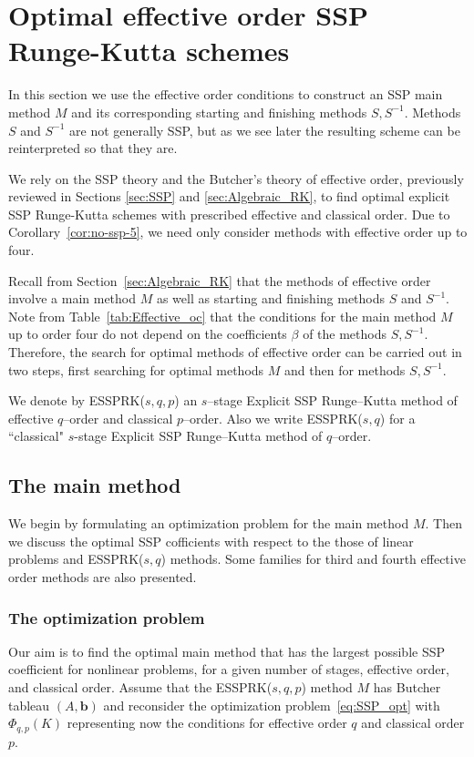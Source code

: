 \section{Optimal effective order SSP Runge-Kutta schemes}\label{sec:optimal_ESSPRK}
In this section we use the effective order conditions to construct an SSP main method $M$ and 
its corresponding starting and finishing methods $S, S^{-1}$. 
Methods $S$ and $S^{-1}$ are not generally SSP, but as we see later the resulting scheme can 
be reinterpreted so that they are.

We rely on the SSP theory and the Butcher's theory of effective order, previously reviewed in 
Sections \ref{sec:SSP} and \ref{sec:Algebraic_RK}, to find optimal explicit SSP Runge-Kutta 
schemes with prescribed effective and classical order. 
Due to Corollary~\ref{cor:no-ssp-5}, we need only consider methods with effective order up 
to four.

Recall from Section~\ref{sec:Algebraic_RK} that the methods of effective order involve a main 
method $M$ as well as starting and finishing methods $S$ and $S^{-1}$.
Note from Table~\ref{tab:Effective_oc} that the conditions for the main method $M$ up to 
order four do not depend on the coefficients $\beta$ of the methods $S, S^{-1}$. 
Therefore, the search for optimal methods of effective order can be carried out in two steps, 
first searching for optimal methods $M$ and then for methods $S, S^{-1}$.

We denote by ESSPRK($s,q,p$) an $s$--stage Explicit SSP Runge--Kutta method of effective 
$q$--order and classical $p$--order. 
Also we write ESSPRK($s,q$) for a ``classical" $s$-stage Explicit SSP Runge--Kutta method of 
$q$--order.

\subsection{The main method}\label{subsec:main_method}
We begin by formulating an optimization problem for the main method $M$. 
Then we discuss the optimal SSP cofficients with respect to the those of linear problems and 
ESSPRK($s,q$) methods. Some families for third and fourth effective order methods are also 
presented.

\subsubsection{The optimization problem}\label{subsubsec:opt_problem}
Our aim is to find the optimal main method that has the largest possible SSP coefficient for 
nonlinear problems, for a given number of stages, effective order, and classical order. 
Assume that the ESSPRK($s,q,p$) method $M$ has Butcher tableau  $(A, \bm{b})$ and 
reconsider the optimization problem~\eqref{eq:SSP_opt} with $\Phi_{q,p}(K)$ representing 
now the conditions for effective order $q$ and classical order $p$.

